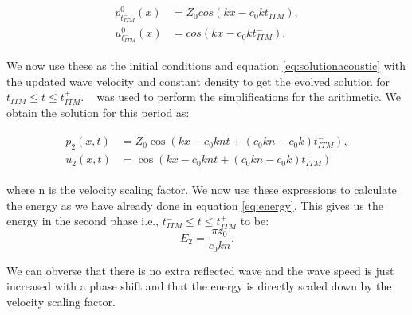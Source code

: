 \begin{align}
    \begin{split}
        p^0_{t_{ITM}^-}\left(x\right) &= Z_0 cos\left(kx - c_0kt_{ITM}^-\right), \\
        u^0_{t_{ITM}^-}\left(x\right) &= cos\left(kx - c_0kt_{ITM}^-\right) .
    \end{split}
\end{align}

We now use these as the initial conditions and equation \ref{eq:solutionacoustic} with the updated wave velocity and constant density to get the evolved solution for $t_{ITM}^- \leq t \leq t_{ITM}^+ $. ~\parencite{sagemath} was used to perform the simplifications for the arithmetic. We obtain the solution for this period as:

\begin{align}
    \begin{split}
        p_{2}\left(x, t\right) &= Z_{0} \cos\left(kx -c_{0} k n t + {\left(c_{0} k n - c_{0} k\right)} \mathit{t_{ITM}^-}\right), \\
        u_{2}\left(x, t\right) &= \cos\left(kx -c_{0} k n t + {\left(c_{0} k n - c_{0} k\right)} \mathit{t_{ITM}^-} \right)
    \end{split}
\end{align}

where n is the velocity scaling factor. We now use these expressions to calculate the energy as we have already done in equation \ref{eq:energy}. This gives us the energy in the second phase i.e., $t_{ITM}^- \leq t \leq t_{ITM}^+ $ to be:
\begin{equation}
    E_2 = \frac{\pi z_{0}}{c_{0} k n} .
\end{equation}

We can obverse that there is no extra reflected wave and the wave speed is just increased with a phase shift and that the energy is directly scaled down by the velocity scaling factor. \\


